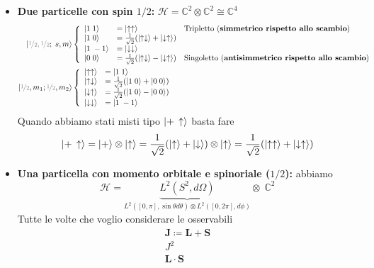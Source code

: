 \documentclass[a4paper,10pt]{article}
\theoremstyle{definition}
\newcommand{\bv}{\boldsymbol} %
\newcommand{\im}{\mathbb{C}} %
\newcommand{\hil}{\mathcal{H}} %
\theoremstyle{indentdefinition}
\theoremstyle{indenttheorem}
\theoremstyle{myremark}
\theoremstyle{indentgeneral}
\begin{document}
\begin{itemize}
    \item \textbf{Due particelle con spin $1/2$:} $\hil=\im^2\otimes\im^2\cong \im^4$
    \begin{align*}
       \ket{\textcolor{gray}{\nicefrac{1}{2},\nicefrac{1}{2}};\;s,m} &\left\{\begin{array}{lll}
           \ket{1\;1} &=\ket{\uparrow\uparrow}  & \text{Tripletto (\textbf{simmetrico rispetto allo scambio})}\\
             \ket{1\;0} &=\frac{1}{\sqrt{2}}(\ket{\uparrow\downarrow}+\ket{\downarrow\uparrow})  \\
              \ket{1\;-1} &=\ket{\downarrow\downarrow}  \\
              \ket{0\;0} &=\frac{1}{\sqrt{2}}(\ket{\uparrow\downarrow}-\ket{\downarrow\uparrow})  & \text{Singoletto (\textbf{antisimmetrico  rispetto allo scambio})}\\
        \end{array}\right.\\
        \ket{\textcolor{gray}{\nicefrac{1}{2}},m_1;\textcolor{gray}{\nicefrac{1}{2}},m_2}& \left\{\begin{array}{ll}
           \ket{\uparrow\uparrow} &=\ket{1\; 1} \\
             \ket{\uparrow\downarrow} &=\frac{1}{\sqrt{2}}(\ket{1\; 0}+\ket{0\;0})  \\
              \ket{\downarrow\uparrow} &=\frac{1}{\sqrt{2}}(\ket{1\; 0}-\ket{0\;0})   \\
              \ket{\downarrow\downarrow} &= \ket{1\; -1} \\
        \end{array}\right.
    \end{align*}
    Quando abbiamo stati misti tipo $\ket{+\,\uparrow}$ basta fare
    $$\ket{+\,\uparrow}=\ket{+}\otimes\ket{\uparrow}=\frac{1}{\sqrt{2}}(\ket{\uparrow}+\ket{\downarrow})\otimes\ket{\uparrow}=\frac{1}{\sqrt{2}}(\ket{\uparrow\uparrow}+\ket{\downarrow\uparrow})$$
    \item\textbf{Una particella con momento orbitale e spinoriale ($1/2$):} abbiamo
    $$\hil=\underbrace{L^2(S^2,d\Omega)}_{L^2([0,\pi],\sin\theta d\theta)\otimes L^2([0,2\pi],d\phi)}\otimes \;\im^2$$
    Tutte le volte che voglio considerare le osservabili
    $$\begin{array}{l}
         \boxed{\bv{J} \coloneqq \bv{L}+\bv{S}}  \\
         J^2 \\
         \bv{L}\cdot \bv{S}

\end{array}$$
\end{itemize}
\end{document}

